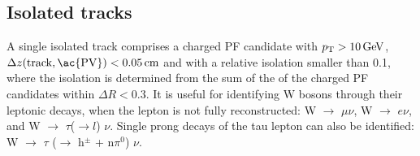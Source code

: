 %


\subsection{Isolated tracks}
\label{sec:SIT}

A single isolated track comprises a charged PF candidate with ${p_{\text T}} >
10 \mathrm{\,Ge\kern -0.1em V}$, $\Delta z(\mathrm{track}, \mathrm{\ac{PV}}) < 0.05 \,
\mathrm{cm}$ and with a relative isolation smaller than 0.1, where the
isolation is determined from the sum of the \Pt of the charged PF
candidates within $\Delta R < 0.3$. It is useful for identifying W
bosons through their leptonic decays, when the lepton is not fully
reconstructed: W $\rightarrow$ $\mu \nu$, W $\rightarrow$ $e\nu$, and
W $\rightarrow$ $\tau$($\rightarrow l$) $\nu$.  Single prong decays of
the tau lepton can also be identified: W $\rightarrow$ $\tau$
($\rightarrow$ h$^{\pm}$ + n$\pi^{0}$) $\nu$. 

